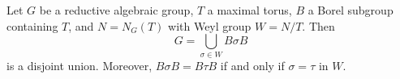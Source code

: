 Let $G$ be a reductive algebraic group, $T$ a maximal torus, $B$ a Borel subgroup containing $T$, and $N = N_G(T)$ with Weyl group $W = N/T$. Then
$$G = \bigcup_{\sigma \in W} B\sigma B$$
is a disjoint union. Moreover, $B\sigma B = B\tau B$ if and only if $\sigma = \tau$ in $W$.
